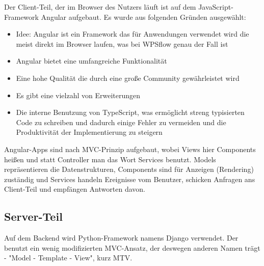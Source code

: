         Der Client-Teil, der im Browser des Nutzers läuft ist auf dem JavaScript-Framework Angular aufgebaut. Es wurde aus folgenden Gründen ausgewählt:
        
        \begin{itemize}
            \item Idee: Angular ist ein Framework das für Anwendungen verwendet wird die meist direkt im Browser laufen, was bei WPSflow genau der Fall ist
            \item Angular bietet eine umfangreiche Funktionalität
            \item Eine hohe Qualität die durch eine große Community gewährleistet wird
            \item Es gibt eine vielzahl von Erweiterungen
            \item Die interne Benutzung von TypeScript, was ermöglicht streng typisierten Code zu schreiben und dadurch einige Fehler zu vermeiden und die Produktivität der Implementierung zu steigern
        \end{itemize}

        \noindent Angular-Apps sind nach MVC-Prinzip aufgebaut, wobei Views hier Components heißen und statt Controller man das Wort Services benutzt. Models repräsentieren die Datenstrukturen, Components sind für Anzeigen (Rendering) zuständig und Services handeln Ereignisse vom Benutzer, schicken Anfragen ans Client-Teil und empfängen Antworten davon.
        
        \subsection{Server-Teil}
        
        Auf dem Backend wird Python-Framework namens Django verwendet. Der benutzt ein wenig modifizierten MVC-Ansatz, der deswegen anderen Namen trägt - "Model - Template - View", kurz MTV.
        
